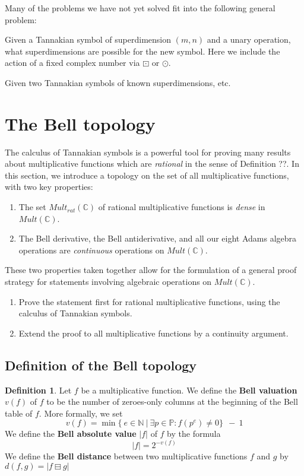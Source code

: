 \documentclass[a4paper]{article}
\theoremstyle{definition}
\newtheorem{definition}{Definition}[section]
\theoremstyle{remark}
\newcommand{\N}{\mathbb{N}}
\newcommand{\C}{\mathbb{C}}
\newcommand{\defhl}[1]{\textbf{#1}}
\begin{document}
Many of the problems we have not yet solved fit into the following general problem: 

Given a Tannakian symbol of superdimension $(m,n)$ and a unary operation, what superdimensions are possible for the new symbol. Here we include the action of a fixed complex number via $\boxdot$ or $\odot$.

Given two Tannakian symbols of known superdimensions, etc. 


\section{The Bell topology}  \label{sec:BellTopology}

The calculus of Tannakian symbols is a powerful tool for proving many results about multiplicative functions which are \emph{rational} in the sense of Definition ??. In this section, we introduce a topology on the set of all multiplicative functions, with two key properties:
\begin{enumerate}
\item The set $Mult_{rat}(\C)$ of rational multiplicative functions is \emph{dense} in $Mult(\C)$.
\item The Bell derivative, the Bell antiderivative, and all our eight Adams algebra operations are \emph{continuous} operations on $Mult(\C)$. 

\end{enumerate}

These two properties taken together allow for the formulation of a general proof strategy for statements involving algebraic operations on $Mult(\C)$.
\begin{enumerate}
\item Prove the statement first for rational multiplicative functions, using the calculus of Tannakian symbols.
\item Extend the proof to all multiplicative functions by a continuity argument.
\end{enumerate} 

\subsection{Definition of the Bell topology}


\begin{definition}
Let $f$ be a multiplicative function. We define the \defhl{Bell valuation} $v(f)$ of $f$ to be the number of zeroes-only columns at the beginning of the Bell table of $f$. More formally, we set 
$$  v(f) = \min \{ \ e \in \N \ \vert \ \exists p \in \mathbb{P}:  f(p^e) \neq 0 \} \ \ - \ 1   $$
We define the \defhl{Bell absolute value} $\vert  f \vert$ of $f$ by the formula
$$  \vert f \vert = 2^{-v(f)}  $$
We define the \defhl{Bell distance} between two multiplicative functions $f$ and $g$ by
$d(f, g) = \vert   f \boxminus g \vert$
\end{definition}
\end{document}
